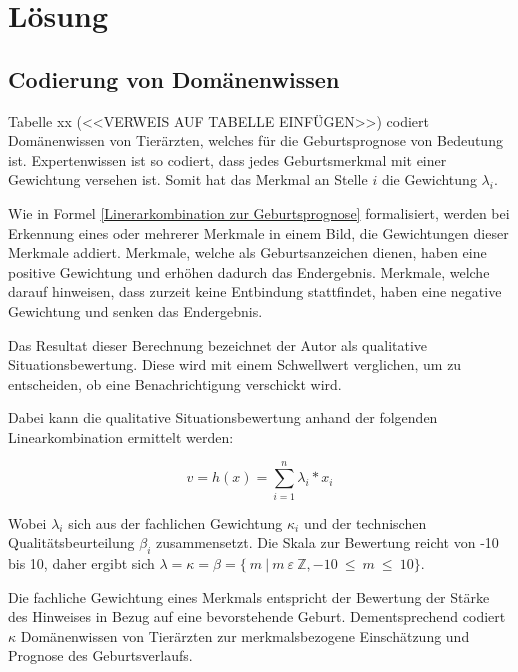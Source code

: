 
	
\chapter{Lösung}

\section{Codierung von Domänenwissen}

Tabelle xx (<<VERWEIS AUF TABELLE EINFÜGEN>>) codiert Domänenwissen von Tierärzten, welches für die Geburtsprognose von Bedeutung ist. Expertenwissen ist so codiert, dass jedes Geburtsmerkmal mit einer Gewichtung versehen ist. Somit hat das Merkmal an Stelle $i$ die Gewichtung $\lambda_{i}$.



Wie in Formel \ref{Linerarkombination zur Geburtsprognose} formalisiert, werden bei Erkennung eines oder mehrerer Merkmale in einem Bild, die Gewichtungen dieser Merkmale addiert. Merkmale, welche als Geburtsanzeichen dienen, haben eine positive Gewichtung und erhöhen dadurch das Endergebnis. Merkmale, welche darauf hinweisen, dass zurzeit keine Entbindung stattfindet, haben eine negative Gewichtung und senken das Endergebnis.


Das Resultat dieser Berechnung bezeichnet der Autor als \flqq qualitative Situationsbewertung\frqq. Diese wird mit einem Schwellwert verglichen, um zu entscheiden, ob eine Benachrichtigung verschickt wird.

Dabei kann die qualitative Situationsbewertung anhand der folgenden Linearkombination ermittelt werden: 



\begin{equation}\label{Linerarkombination zur Geburtsprognose}
v = h(x) = \sum_{i=1}^n \lambda_{i}*x_{i}
\end{equation}

 
Wobei $\lambda_{i}$ sich aus der fachlichen Gewichtung $\kappa_{i}$ und der technischen Qualitätsbeurteilung $\beta_{i}$ zusammensetzt. Die Skala zur Bewertung reicht von -10 bis 10, daher ergibt sich $ \lambda = \kappa = \beta = \{ \:  m \: | \:  m \:  \varepsilon \:  \mathbb{Z}, -10 \:  \leq \: m \: \leq \:  10\} $.

Die fachliche Gewichtung eines Merkmals entspricht der Bewertung  der Stärke des Hinweises in Bezug auf eine bevorstehende Geburt. Dementsprechend codiert $\kappa$ Domänenwissen von Tierärzten zur merkmalsbezogene Einschätzung und Prognose des Geburtsverlaufs.

